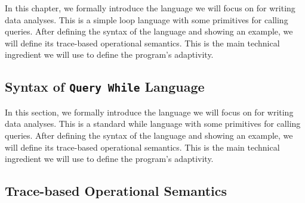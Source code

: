 In this chapter, we formally introduce the language we will focus on for writing data analyses.  
This is a simple loop language with some primitives for calling queries. 
After defining the syntax of the language and showing an example, we will define its trace-based operational semantics. 
This is the main technical ingredient we will use to define the program's adaptivity.

\subsection{Syntax of {\tt Query While} Language}
\label{sec:language-syntax}
In this section, we formally introduce the language we will focus on for writing data analyses.  This is a standard while language with some primitives for calling queries. After defining the syntax of the language and showing an example, we will define its trace-based operational semantics. This is the main technical ingredient we will use to define the program's adaptivity.



\subsection{Trace-based Operational Semantics}
\label{sec:language-os}
